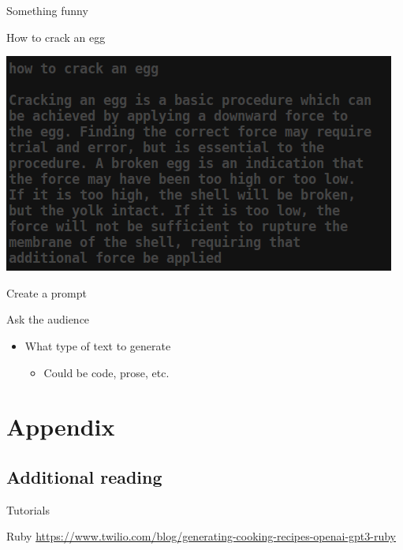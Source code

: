 \documentclass[presentation]{beamer}
\begin{document}
\begin{frame}[label={sec:orgd3fafa4}]{Something funny}
\begin{block}{How to crack an egg}
\begin{center}
\includegraphics[width=.9\linewidth]{./crack-an-egg.png}
\end{center}
\end{block}
\end{frame}

\begin{frame}[label={sec:org3ea41b0}]{Create a prompt}
\begin{block}{Ask the audience}
\begin{itemize}
\item What type of text to generate
\begin{itemize}
\item Could be code, prose, etc.
\end{itemize}
\end{itemize}
\end{block}
\end{frame}

\section{Appendix}
\label{sec:org2d27609}
\subsection{Additional reading}
\label{sec:org2e0ed94}
\begin{frame}[label={sec:orgf746894}]{Tutorials}
\begin{block}{Ruby}
{\footnotesize
\url{https://www.twilio.com/blog/generating-cooking-recipes-openai-gpt3-ruby}
}
\end{block}
\end{frame}
\end{document}
